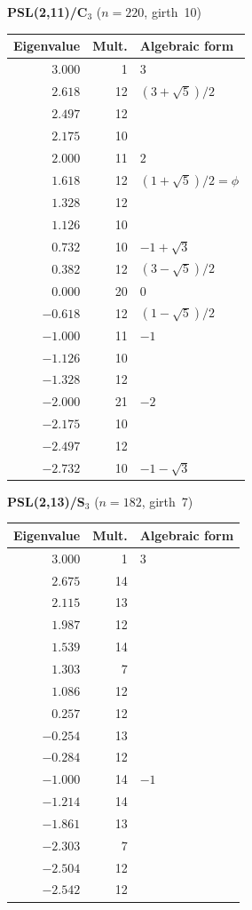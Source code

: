 \documentclass[11pt,a4paper]{article}
\theoremstyle{plain}
\theoremstyle{definition}
\theoremstyle{remark}
\begin{document}
\begin{tcolorbox}[breakable, colback=black!5, colframe=black!5,
  boxrule=0pt, sharp corners]
\bigskip\noindent\textbf{PSL(2,11)/C$_3$} \quad ($n=220$, girth~10)
\smallskip

\begin{center}
\begin{tabular}{rrl}
\toprule
Eigenvalue & Mult. & Algebraic form \\
\midrule
$3.000$ & 1 & $3$ \\
$2.618$ & 12 & $(3+\sqrt{5})/2$ \\
$2.497$ & 12 & \\
$2.175$ & 10 & \\
$2.000$ & 11 & $2$ \\
$1.618$ & 12 & $(1+\sqrt{5})/2 = \phi$ \\
$1.328$ & 12 & \\
$1.126$ & 10 & \\
$0.732$ & 10 & $-1+\sqrt{3}$ \\
$0.382$ & 12 & $(3-\sqrt{5})/2$ \\
$0.000$ & 20 & $0$ \\
$-0.618$ & 12 & $(1-\sqrt{5})/2$ \\
$-1.000$ & 11 & $-1$ \\
$-1.126$ & 10 & \\
$-1.328$ & 12 & \\
$-2.000$ & 21 & $-2$ \\
$-2.175$ & 10 & \\
$-2.497$ & 12 & \\
$-2.732$ & 10 & $-1-\sqrt{3}$ \\
\bottomrule
\end{tabular}
\end{center}

\bigskip\noindent\textbf{PSL(2,13)/S$_3$} \quad ($n=182$, girth~7)
\smallskip

\begin{center}
\begin{tabular}{rrl}
\toprule
Eigenvalue & Mult. & Algebraic form \\
\midrule
$3.000$ & 1 & $3$ \\
$2.675$ & 14 & \\
$2.115$ & 13 & \\
$1.987$ & 12 & \\
$1.539$ & 14 & \\
$1.303$ & 7 & \\
$1.086$ & 12 & \\
$0.257$ & 12 & \\
$-0.254$ & 13 & \\
$-0.284$ & 12 & \\
$-1.000$ & 14 & $-1$ \\
$-1.214$ & 14 & \\
$-1.861$ & 13 & \\
$-2.303$ & 7 & \\
$-2.504$ & 12 & \\
$-2.542$ & 12 & \\
\bottomrule
\end{tabular}
\end{center}


\end{tcolorbox}
\end{document}
